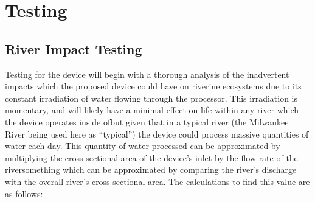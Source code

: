 \documentclass[fleqn,10pt]{SelfArx} %
\begin{document}
	\section{Testing}
	\subsection{River Impact Testing}
	Testing for the device will begin with a thorough analysis of the inadvertent impacts which the proposed device could have on riverine ecosystems due to its constant irradiation of water flowing through the processor. This irradiation is momentary, and will likely have a minimal effect on life within any river which the device operates inside of\textemdash but given that in a typical river (the Milwaukee River being used here as “typical”) the device could process massive quantities of water each day. This quantity of water processed can be approximated by multiplying the cross-sectional area of the device’s inlet by the flow rate of the river\textemdash something which can be approximated by comparing the river’s discharge with the overall river’s cross-sectional area. The calculations to find this value are as follows:
\end{document}
